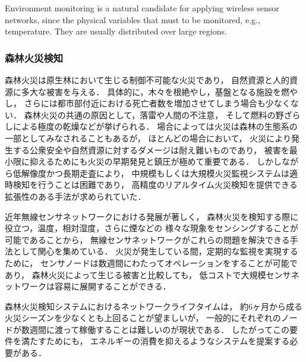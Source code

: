 Environment monitoring is a natural candidate for applying wireless sensor networks, since the physical variables that must to be monitored, e.g., temperature. They are usually distributed over large regions.



\subsubsection{森林火災検知}

\vspace{0.5em}森林火災は原生林において生じる制御不可能な火災であり，
自然資源と人的資源に多大な被害を与える．
具体的に，木々を根絶やし，基盤となる施設を燃やし，
さらには都市部付近における死亡者数を増加させてしまう場合も少なくない．
森林火災の共通の原因として，落雷や人間の不注意，
そして燃料の野ざらしによる極度の乾燥などが挙げられる．
場合によっては火災は森林の生態系の一部としてみなされることもあるが，
ほとんどの場合において，
火災により発生する公衆安全や自然資源に対するダメージは耐え難いものであり，
被害を最小限に抑えるためにも火災の早期発見と鎮圧が極めて重要である．
しかしながら低解像度かつ長期走査により，
中規模もしくは大規模火災監視システムは適時検知を行うことは困難であり，
高精度のリアルタイム火災検知を提供できる拡張性のある手法が求められていた．

近年無線センサネットワークにおける発展が著しく，
森林火災を検知する際に役立つ，温度，相対湿度，さらに煙などの
様々な現象をセンシングすることが可能であることから，
無線センサネットワークがこれらの問題を解決できる手法として関心を集めている．
火災が発生している間，定期的な監視を実現するために，
センサノードは数週間にわたってオペレーションをすることが可能であり，
森林火災によって生じる被害と比較しても，
低コストで大規模センサネットワークは容易に展開することができる．


森林火災検知システムにおけるネットワークライフタイムは，
約6ヶ月から成る火災シーズンを少なくとも上回ることが望ましいが，
一般的にそれぞれのノードが数週間に渡って稼働することは難しいのが現状である．
したがってこの要件を満たすためにも，
エネルギーの消費を抑えるようなシステムを提案する必要がある．






